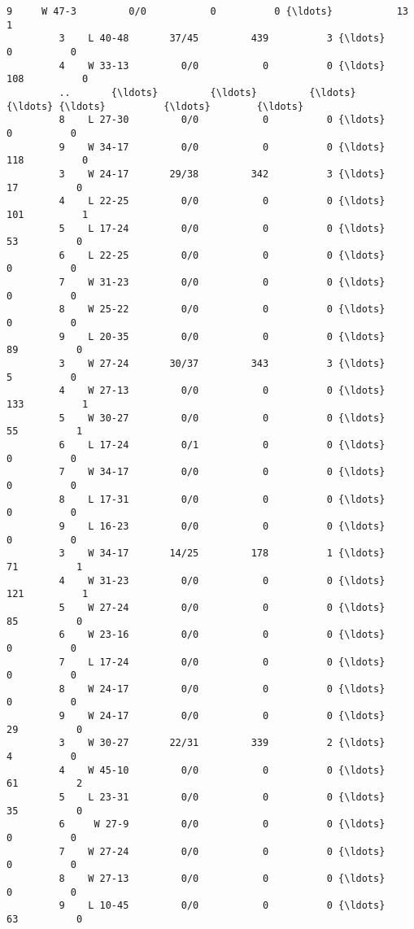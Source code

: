 \documentclass[11pt]{article}
\begin{document}
\begin{Verbatim}[commandchars=\\\{\}]
         9     W 47-3         0/0           0          0 {\ldots}           13          1   
         3    L 40-48       37/45         439          3 {\ldots}            0          0   
         4    W 33-13         0/0           0          0 {\ldots}          108          0   
         ..       {\ldots}         {\ldots}         {\ldots}        {\ldots} {\ldots}          {\ldots}        {\ldots}   
         8    L 27-30         0/0           0          0 {\ldots}            0          0   
         9    W 34-17         0/0           0          0 {\ldots}          118          0   
         3    W 24-17       29/38         342          3 {\ldots}           17          0   
         4    L 22-25         0/0           0          0 {\ldots}          101          1   
         5    L 17-24         0/0           0          0 {\ldots}           53          0   
         6    L 22-25         0/0           0          0 {\ldots}            0          0   
         7    W 31-23         0/0           0          0 {\ldots}            0          0   
         8    W 25-22         0/0           0          0 {\ldots}            0          0   
         9    L 20-35         0/0           0          0 {\ldots}           89          0   
         3    W 27-24       30/37         343          3 {\ldots}            5          0   
         4    W 27-13         0/0           0          0 {\ldots}          133          1   
         5    W 30-27         0/0           0          0 {\ldots}           55          1   
         6    L 17-24         0/1           0          0 {\ldots}            0          0   
         7    W 34-17         0/0           0          0 {\ldots}            0          0   
         8    L 17-31         0/0           0          0 {\ldots}            0          0   
         9    L 16-23         0/0           0          0 {\ldots}            0          0   
         3    W 34-17       14/25         178          1 {\ldots}           71          1   
         4    W 31-23         0/0           0          0 {\ldots}          121          1   
         5    W 27-24         0/0           0          0 {\ldots}           85          0   
         6    W 23-16         0/0           0          0 {\ldots}            0          0   
         7    L 17-24         0/0           0          0 {\ldots}            0          0   
         8    W 24-17         0/0           0          0 {\ldots}            0          0   
         9    W 24-17         0/0           0          0 {\ldots}           29          0   
         3    W 30-27       22/31         339          2 {\ldots}            4          0   
         4    W 45-10         0/0           0          0 {\ldots}           61          2   
         5    L 23-31         0/0           0          0 {\ldots}           35          0   
         6     W 27-9         0/0           0          0 {\ldots}            0          0   
         7    W 27-24         0/0           0          0 {\ldots}            0          0   
         8    W 27-13         0/0           0          0 {\ldots}            0          0   
         9    L 10-45         0/0           0          0 {\ldots}           63          0   
         

\end{Verbatim}
\end{document}
